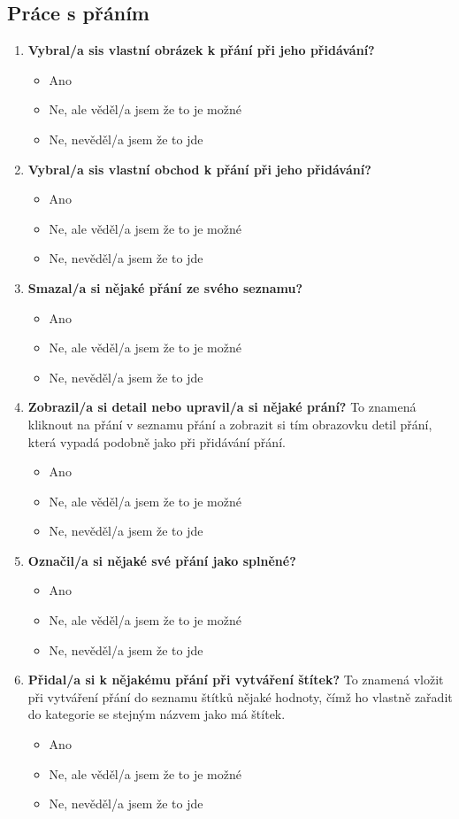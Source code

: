 \subsection{Práce s přáním}
\begin{enumerate}
\item \textbf{Vybral/a sis vlastní obrázek k přání při jeho přidávání?}
		\begin{itemize}
		\item Ano
		\item Ne, ale věděl/a jsem že to je možné
		\item Ne, nevěděl/a jsem že to jde
		\end{itemize}
\item \textbf{Vybral/a sis vlastní obchod k přání při jeho přidávání?}
		\begin{itemize}
		\item Ano
		\item Ne, ale věděl/a jsem že to je možné
		\item Ne, nevěděl/a jsem že to jde
		\end{itemize}
\item \textbf{Smazal/a si nějaké přání ze svého seznamu?}
		\begin{itemize}
		\item Ano
		\item Ne, ale věděl/a jsem že to je možné
		\item Ne, nevěděl/a jsem že to jde
		\end{itemize}
\item \textbf{Zobrazil/a si detail nebo upravil/a si nějaké prání?} To znamená kliknout na přání v seznamu přání a zobrazit si tím obrazovku detil přání, která vypadá podobně jako při přidávání přání.
		\begin{itemize}
		\item Ano
		\item Ne, ale věděl/a jsem že to je možné
		\item Ne, nevěděl/a jsem že to jde
		\end{itemize}
\item \textbf{Označil/a si nějaké své přání jako splněné?}
		\begin{itemize}
		\item Ano
		\item Ne, ale věděl/a jsem že to je možné
		\item Ne, nevěděl/a jsem že to jde
		\end{itemize}
\item \textbf{Přidal/a si k nějakému přání při vytváření štítek?} To znamená vložit při vytváření přání do seznamu štítků nějaké hodnoty, čímž ho vlastně zařadit do kategorie se stejným názvem jako má štítek.
		\begin{itemize}
		\item Ano
		\item Ne, ale věděl/a jsem že to je možné
		\item Ne, nevěděl/a jsem že to jde
		\end{itemize}
\end{enumerate}

